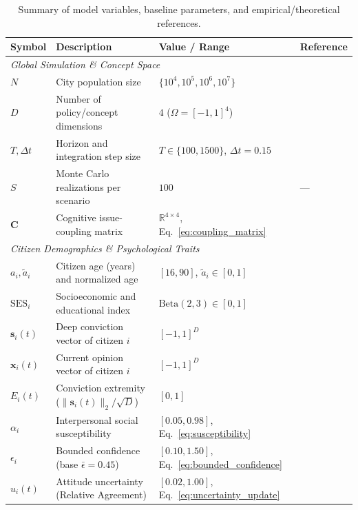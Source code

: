 \begin{table}[htbp]
\centering
\caption{Summary of model variables, baseline parameters, and empirical/theoretical references.}
\label{tab:model_parameters}
\footnotesize
\setlength{\tabcolsep}{4.5pt}
\begin{tabular}{lp{5.1cm}p{3.6cm}p{3.8cm}}
\toprule
\textbf{Symbol} & \textbf{Description} & \textbf{Value / Range} & \textbf{Reference} \\
\midrule
\multicolumn{4}{l}{\textit{Global Simulation \& Concept Space}} \\
$N$ & City population size & $\{10^4, 10^5, 10^6, 10^7\}$ & \citet{bettencourt2007growth} \\
$D$ & Number of policy/concept dimensions & $4$ ($\Omega = [-1, 1]^4$) & \citet{converse1964nature} \\
$T, \Delta t$ & Horizon and integration step size & $T \in \{100, 1500\}$, $\Delta t = 0.15$ & \citet{friedkin1990social} \\
$S$ & Monte Carlo realizations per scenario & $100$ & --- \\
$\mathbf{C}$ & Cognitive issue-coupling matrix & $\mathbb{R}^{4 \times 4}$, Eq.~\eqref{eq:coupling_matrix} & \citet{friedkin2016network} \\
\midrule
\multicolumn{4}{l}{\textit{Citizen Demographics \& Psychological Traits}} \\
$a_i, \tilde{a}_i$ & Citizen age (years) and normalized age & $[16, 90]$, $\tilde{a}_i \in [0, 1]$ & \citet{ibge2022censo} \\
$\mathrm{SES}_i$ & Socioeconomic and educational index & $\mathrm{Beta}(2, 3) \in [0, 1]$ & \citet{ibge2022censo} \\
$\mathbf{s}_i(t)$ & Deep conviction vector of citizen $i$ & $[-1, 1]^D$ & \citet{converse1964nature, kiley2020measuring} \\
$\mathbf{x}_i(t)$ & Current opinion vector of citizen $i$ & $[-1, 1]^D$ & \citet{zaller1992nature} \\
$E_i(t)$ & Conviction extremity ($\|\mathbf{s}_i(t)\|_2 / \sqrt{D}$) & $[0, 1]$ & \citet{howe2017attitude} \\
$\alpha_i$ & Interpersonal social susceptibility & $[0.05, 0.98]$, Eq.~\eqref{eq:susceptibility} & \citet{friedkin1990social, alwin1991aging} \\
$\epsilon_i$ & Bounded confidence (base $\bar{\epsilon}=0.45$) & $[0.10, 1.50]$, Eq.~\eqref{eq:bounded_confidence} & \citet{deffuant2000mixing, hegselmann2002opinion} \\
$u_i(t)$ & Attitude uncertainty (Relative Agreement) & $[0.02, 1.00]$, Eq.~\eqref{eq:uncertainty_update} & \citet{deffuant2002how} \\

\end{tabular}
\end{table}
